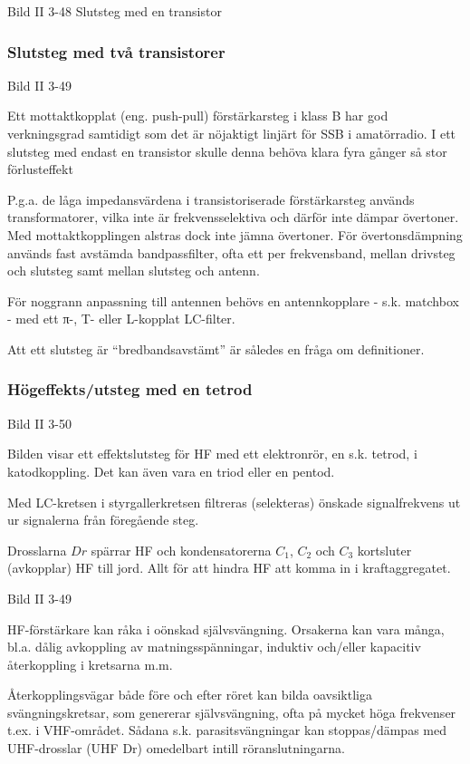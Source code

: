 Bild II 3-48 Slutsteg med en transistor

\subsubsection{Slutsteg med två transistorer}

Bild II 3-49

Ett mottaktkopplat (eng. push-pull) förstärkarsteg i klass B har god
verkningsgrad samtidigt som det är nöjaktigt linjärt för SSB i
amatörradio. I ett slutsteg med endast en transistor skulle denna
behöva klara fyra gånger så stor förlusteffekt

P.g.a. de låga impedansvärdena i transistoriserade förstärkarsteg
används transformatorer, vilka inte är frekvensselektiva och därför
inte dämpar övertoner. Med mottaktkopplingen alstras dock inte jämna
övertoner. För övertonsdämpning används fast avstämda bandpassfilter,
ofta ett per frekvensband, mellan drivsteg och slutsteg samt mellan
slutsteg och antenn.

För noggrann anpassning till antennen behövs en antennkopplare -
s.k. matchbox - med ett π-, T- eller L-kopplat LC-filter.

Att ett slutsteg är ``bredbandsavstämt'' är således en fråga om
definitioner.

\subsubsection{Högeffekts/utsteg med en tetrod}

Bild II 3-50

Bilden visar ett effektslutsteg för HF med ett elektronrör, en
s.k. tetrod, i katodkoppling.  Det kan även vara en triod eller en
pentod.

Med LC-kretsen i styrgallerkretsen filtreras (selekteras) önskade
signalfrekvens ut ur signalerna från föregående steg.

Drosslarna \(Dr\) spärrar HF och kondensatorerna \(C_1\), \(C_2\) och
\(C_3\) kortsluter (avkopplar) HF till jord. Allt för att hindra HF
att komma in i kraftaggregatet.

Bild II 3-49

HF-förstärkare kan råka i oönskad självsvängning. Orsakerna kan vara
många, bl.a.  dålig avkoppling av matningsspänningar, induktiv
och/eller kapacitiv återkoppling i kretsarna m.m.

Återkopplingsvägar både före och efter röret kan bilda oavsiktliga
svängningskretsar, som genererar självsvängning, ofta på mycket höga
frekvenser t.ex. i VHF-området. Sådana s.k. parasitsvängningar kan
stoppas/dämpas med UHF-drosslar (UHF Dr) omedelbart intill
röranslutningarna.

